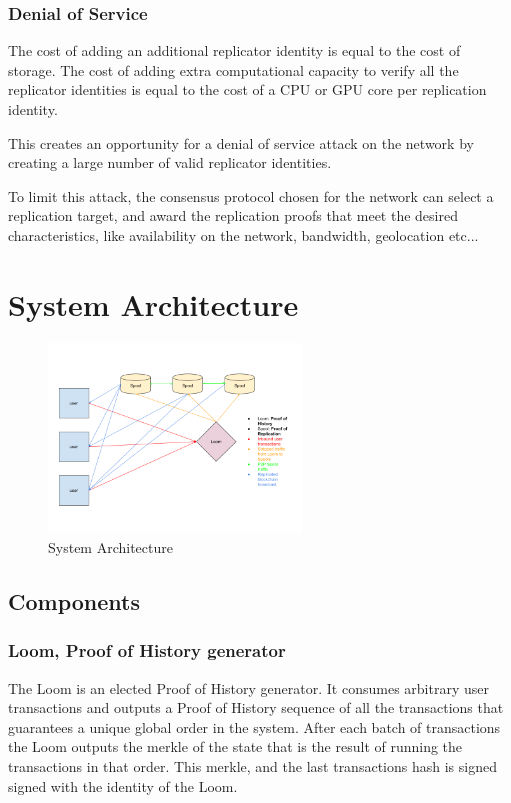 \documentclass[12pt]{article}
\begin{document}
\subsubsection{Denial of Service}
The cost of adding an additional replicator identity is equal to the cost of storage.  The cost of adding extra computational capacity to verify all the replicator identities is equal to the cost of a CPU or GPU core per replication identity.

This creates an opportunity for a denial of service attack on the network by creating a large number of valid replicator identities.

To limit this attack, the consensus protocol chosen for the network can select a replication target, and award the replication proofs that meet the desired characteristics, like availability on the network, bandwidth, geolocation etc...
\section{System Architecture}

\begin{figure}
  \begin{center}
    \centering
    \includegraphics[width=0.6\textwidth]{figures/fig_9.png}
    \caption[Fig 9]{System Architecture \label{fig_9}}
  \end{center}
  \end{figure}

\subsection{Components}

\subsubsection{Loom, Proof of History generator}
The Loom is an elected Proof of History generator.  It consumes arbitrary user transactions and outputs a Proof of History sequence of all the transactions that guarantees a unique global order in the system.  After each batch of transactions the Loom outputs the merkle of the state that is the result of running the transactions in that order.  This merkle, and the last transactions hash is signed signed with the identity of the Loom.
\end{document}

